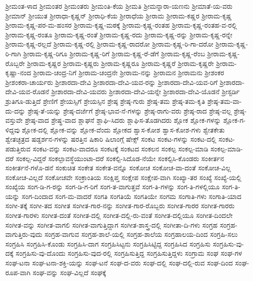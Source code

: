 {ಶ್ರೀಮಂತ-ಳಾದ
ಶ್ರೀಮಂತರ
ಶ್ರೀಮಂತರು
ಶ್ರೀಮಂತಿ-ಕೆಯ
ಶ್ರೀಮತಿ
ಶ್ರೀಮನ್ನಾರಾ-ಯಣನು
ಶ್ರೀಮಾತೆ-ಯ-ವರು
ಶ್ರೀಮಾನ್
ಶ್ರೀಯುತ
ಶ್ರೀರಾಧಾ-ಕೃಷ್ಣನ್
ಶ್ರೀರಾಧಿ-ಕೆಯ
ಶ್ರೀರಾಧೆಯ
ಶ್ರೀರಾಮ
ಶ್ರೀರಾಮ-ಕಷ್ಣರ
ಶ್ರೀರಾಮ-ಕೃಷ್ಣ
ಶ್ರೀರಾಮ-ಕೃಷ್ಣ-ಪರ-ಮ-ಹಂಸರ
ಶ್ರೀರಾಮ-ಕೃಷ್ಣ-ಮಠಕ್ಕೆ
ಶ್ರೀರಾಮ-ಕೃಷ್ಣ-ರಂತಹ
ಶ್ರೀರಾಮ-ಕೃಷ್ಣ-ರಂತಹ-ವ-ರಲ್ಲಿ
ಶ್ರೀರಾಮ-ಕೃಷ್ಣ-ರಂತೂ
ಶ್ರೀರಾಮ-ಕೃಷ್ಣ-ರಂತೆ
ಶ್ರೀರಾಮ-ಕೃಷ್ಣ-ರದು
ಶ್ರೀರಾಮ-ಕೃಷ್ಣ-ರನ್ನು
ಶ್ರೀರಾಮ-ಕೃಷ್ಣ-ರನ್ನೇ
ಶ್ರೀರಾಮ-ಕೃಷ್ಣ-ರಲ್ಲದೆ
ಶ್ರೀರಾಮ-ಕೃಷ್ಣ-ರಲ್ಲಿ
ಶ್ರೀರಾಮ-ಕೃಷ್ಣ-ರಾದರೋ
ಶ್ರೀರಾಮ-ಕೃಷ್ಣ-ರಿ-ಗಾ-ದರೋ
ಶ್ರೀರಾಮ-ಕೃಷ್ಣ-ರಿ-ಗಾಗಿ
ಶ್ರೀರಾಮ-ಕೃಷ್ಣ-ರಿಗೂ
ಶ್ರೀರಾಮ-ಕೃಷ್ಣ-ರಿಗೆ
ಶ್ರೀರಾಮ-ಕೃಷ್ಣ-ರೆ-ಡೆಗೆ
ಶ್ರೀರಾಮ-ಕೃಷ್ಣ-ರೆಂಬ
ಶ್ರೀರಾಮ-ಕೃಷ್ಣ-ರೊಬ್ಬರೇ
ಶ್ರೀರಾಮ-ಕೃಷ್ಣರ
ಶ್ರೀರಾಮ-ಕೃಷ್ಣರು
ಶ್ರೀರಾಮ-ಕೃಷ್ಣರೂ
ಶ್ರೀರಾಮ-ಕೃಷ್ಣರೆ
ಶ್ರೀರಾಮ-ಕೃಷ್ಣರೇ
ಶ್ರೀರಾಮ-ಕೃಷ್ಣಾ-ನಂದ
ಶ್ರೀರಾಮ-ಚಂದ್ರ-ನಿಗೆ
ಶ್ರೀರಾಮ-ಚಂದ್ರನೇ
ಶ್ರೀರಾಮ-ನನ್ನು
ಶ್ರೀರಾಮನ
ಶ್ರೀರಾಮನು
ಶ್ರೀಶಂಕರ
ಶ್ರೀಶಂಕರಾ-ಚಾರ್ಯರು
ಶ್ರೀಶಾರದಾ-ದೇವಿ
ಶ್ರೀಶಾರದಾ-ದೇವಿ-ಯವ-ರನ್ನು
ಶ್ರೀಶಾರದಾ-ದೇವಿ-ಯವ-ರಿಗೆ
ಶ್ರೀಶಾರದಾ-ದೇವಿ-ಯವ-ರೊಡನೆ
ಶ್ರೀಶಾರದಾ-ದೇವಿ-ಯವರು
ಶ್ರೀಶಾರದಾ-ದೇವಿ-ಯನ್ನೇ
ಶ್ರೀಶಾರದಾ-ದೇವಿ-ಯೊಡನೆ
ಶ್ರೀಸ್ಟರ್ಡಿ
ಶ್ರುತಿಗೂ-ಡುತ್ತಿದೆ
ಶ್ರೇಣಿಗೆ
ಶ್ರೇಯಸ್ಸಿಗೆ
ಶ್ರೇಯಸ್ಸಿನ
ಶ್ರೇಷ್ಠ
ಶ್ರೇಷ್ಠ-ಗುರು
ಶ್ರೇಷ್ಠ-ತಮ
ಶ್ರೇಷ್ಠ-ತಮ-ಕೃತಿ
ಶ್ರೇಷ್ಠ-ತಮ-ವಾ-ದು-ದನ್ನು
ಶ್ರೇಷ್ಠ-ತೆ-ಯನ್ನು
ಶ್ರೇಷ್ಠ-ದರ್ಜೆಗೆ
ಶ್ರೇಷ್ಠ-ಭಾವ-ನೆ-ಗಳನ್ನು
ಶ್ರೇಷ್ಠ-ರಾಗು-ವರು
ಶ್ರೇಷ್ಠ-ರಾದ
ಶ್ರೇಷ್ಠ-ವಲ್ಲ
ಶ್ರೇಷ್ಠ-ವಸ್ತುವೇ
ಶ್ರೇಷ್ಠ-ವಾದ
ಶ್ರೇಷ್ಥ-ವಾದ
ಶ್ಲಾಘನೆ
ಶ್ಲಾಘಿ-ಸಿದರು
ಶ್ಲಾಘಿಸ-ತೊಡಗಿದರು
ಶ್ಲೋಕ
ಶ್ಲೋಕ-ಗಳನ್ನು
ಶ್ಲೋಕ-ಗ-ಳಿದ್ದವು
ಶ್ಲೋಕ-ದಲ್ಲಿ
ಶ್ಲೋಕ-ವನ್ನು
ಶ್ಲೋಕ-ವೆಂದು
ಶ್ಲೋಕದ
ಶ್ವಾಸ-ಕೋಶ
ಶ್ವಾಸ-ಕೋಶ-ಗಳು
ಶ್ವೇತಕೇತು
ಶ್ವೇತಚ್ಛತ್ರದ
ಷಡ್ದರ್ಶನ-ಗಳನ್ನು
ಷರತ್ತಿನ
ಷಿಕಾರಿ
ಷಿಲಾಂಗ್ಗೆ
ಷೇಕ್ಸ್
ಸಂಕಟ
ಸಂಕಟ-ಗಳನ್ನು
ಸಂಕಟ-ದಲ್ಲಿ
ಸಂಕಟ-ಪಡುತ್ತಿರುವ
ಸಂಕಟ-ವನ್ನು
ಸಂಕಟ-ವಾದರೂ
ಸಂಕಟಕ್ಕೆ
ಸಂಕಟದ
ಸಂಕಲನ
ಸಂಕಲ್ಪ
ಸಂಕಲ್ಪ-ಮಾಡಿ
ಸಂಕಲ್ಪ-ಮಾಡಿ-ದರೆ
ಸಂಕಲ್ಪ-ವಿದ್ದರೆ
ಸಂಕಲ್ಪಾವಸ್ಥೆಯುಂಟಾ-ದರೆ
ಸಂಕಲ್ಪಿ-ಸಿದೊಡ-ನೆಯೇ
ಸಂಕಲ್ಪಿಸಿ-ಕೊಂಡರು
ಸಂಕೀರ್ತನ
ಸಂಕೀರ್ತನೆ-ಗಳೊ-ಡನೆ
ಸಂಕುಚಿತ
ಸಂಕೇತ
ಸಂಕೇತ-ವನ್ನೊ
ಸಂಕೋಚ
ಸಂಕೋಚ-ವಾ-ದಂತೆ
ಸಂಕೋಚ-ವಿಲ್ಲ
ಸಂಕೋಚ-ವಿಲ್ಲದೆ
ಸಂಕೋಚವೇ
ಸಂಕ್ರಾಂತಿಯ
ಸಂಕ್ಷಿಪ್ತ
ಸಂಕ್ಷೇಪ
ಸಂಕ್ಷೇಪ-ವಾಗಿ
ಸಂಖ್ಯಾ-ತರ
ಸಂಖ್ಯೆ
ಸಂಖ್ಯೆ-ಯಲ್ಲಿ
ಸಂಖ್ಯೆಯ
ಸಂಗ-ಡಿ-ಗ-ರನ್ನು
ಸಂಗ-ಡಿ-ಗ-ರಿಗೆ
ಸಂಗ-ತ-ವಾಗುತ್ತವೆ
ಸಂಗ-ತಿ-ಗಳನ್ನು
ಸಂಗ-ತಿ-ಗಳಲ್ಲಿಯೂ
ಸಂಗ-ತಿ-ಯನ್ನು
ಸಂಗ-ದಿಂದಾದ
ಸಂಗ-ಮ-ವಾದರೆ
ಸಂಗತಿ
ಸಂಗತಿಯೆ
ಸಂಗತಿಯೇ
ಸಂಗಮ
ಸಂಗಾತಿ-ಗಳು
ಸಂಗಾತಿ-ಯಾದ
ಸಂಗೀ-ತಕ್ಕೆ
ಸಂಗೀ-ತದ
ಸಂಗೀತ
ಸಂಗೀತ-ಗಾರ-ನನ್ನು
ಸಂಗೀತ-ಗಾರ-ರೊಬ್ಬರು
ಸಂಗೀತ-ಗಾರರ
ಸಂಗೀತ-ಗಾರರು
ಸಂಗೀತ-ಗಾರಳು
ಸಂಗೀತ-ದಂತೆ
ಸಂಗೀತ-ದಲ್ಲಿ
ಸಂಗೀತ-ದಲ್ಲಿ-ರು-ವಂತೆ
ಸಂಗೀತ-ದಲ್ಲಿಯೂ
ಸಂಗೀತ-ದಿಂದಲೇ
ಸಂಗೀತ-ವನ್ನು
ಸಂಗೀತ-ವಾಗಲಿ
ಸಂಗೀತ-ವಾಗುತ್ತಿದ್ದಾಗ
ಸಂಗೀತ-ಶಾಸ್ತ್ರ-ದಲ್ಲಿ
ಸಂಗೀತಾ-ದಿ-ಗಳು
ಸಂಗ್ರಹ
ಸಂಗ್ರಹ-ವಾಗುತ್ತಿರು-ವುದು
ಸಂಗ್ರಹ-ವಾಗುವ
ಸಂಗ್ರಹ-ಶಾಲೆ-ಯಲ್ಲಿ
ಸಂಗ್ರಹ-ಶಾಲೆಯ
ಸಂಗ್ರಹಾಲಯ-ದಿಂದ
ಸಂಗ್ರಹಿ-ಸಲು
ಸಂಗ್ರಹಿಸಿ
ಸಂಗ್ರಹಿಸಿ-ಕೊಂಡು
ಸಂಗ್ರಹಿಸಿ-ದಾಗ
ಸಂಗ್ರಹಿಸಿಟ್ಟನು
ಸಂಗ್ರಹಿಸಿಟ್ಟಿದ್ದ
ಸಂಗ್ರಹಿಸಿದ
ಸಂಗ್ರಹಿಸು
ಸಂಗ್ರಹಿಸು-ವು-ದಕ್ಕೆ
ಸಂಗ್ರಹಿಸು-ವು-ದೊಂದು
ಸಂಗ್ರಹಿಸು-ವುದ-ರಲ್ಲಿ
ಸಂಗ್ರಹಿಸುತ್ತಿದ್ದ
ಸಂಗ್ರಹಿಸುತ್ತಿದ್ದಳು
ಸಂಗ್ರಾಮ
ಸಂಘ
ಸಂಘ-ಗಳ
ಸಂಘ-ಟನಾ
ಸಂಘ-ಟನಾ-ಶಕ್ತಿ-ಯನ್ನು
ಸಂಘ-ಟನೆ
ಸಂಘ-ದ-ವರು
ಸಂಘ-ದಲ್ಲಿ
ಸಂಘ-ದಲ್ಲಿ-ರುವ
ಸಂಘ-ದಿಂದ
ಸಂಘ-ರೂಪ-ವಾಗಿ
ಸಂಘ-ವನ್ನು
ಸಂಘ-ವಿಲ್ಲದೆ
ಸಂಘಕ್ಕೆ
}

